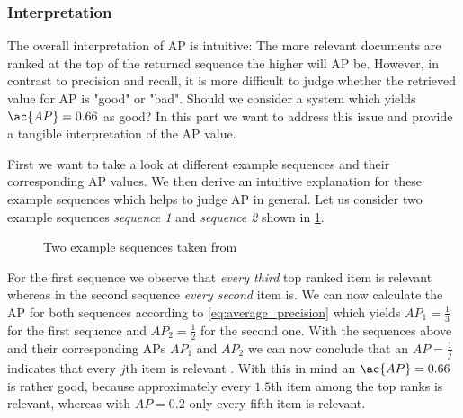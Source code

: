\subsubsection{Interpretation}
\label{chp:fundamentals:sec:metrics:subsec:average_precision:interpretation}
The overall interpretation of \ac{AP} is intuitive: The more relevant documents are ranked at the top of the returned sequence the higher will \ac{AP} be.
However, in contrast to precision and recall, it is more difficult to judge whether the retrieved value for \ac{AP} is "good" or "bad".
Should we consider a system which yields $\ac{AP}=0.66$ as good?
In this part we want to address this issue and provide a tangible interpretation of the \ac{AP} value.

First we want to take a look at different example sequences and their corresponding \ac{AP} values.
We then derive an intuitive explanation for these example sequences which helps to judge \ac{AP} in general.
Let us consider two example sequences \textit{sequence 1} and \textit{sequence 2} shown in \cref{fig:metrics:average_precision:interpreation:sample}.

\begin{figure}[htpb]
    \centering
    \def\svgwidth{\columnwidth}
    
    \caption[Two Example Sequences]{Two example sequences taken from \textcite{Tapaswi:2012}}\label{fig:metrics:average_precision:interpreation:sample}
\end{figure}

For the first sequence we observe that \textit{every third} top ranked item is relevant whereas in the second sequence \textit{every second} item is.
We can now calculate the \ac{AP} for both sequences according to \cref{eq:average_precision} which yields $AP_1= \frac{1}{3}$ for the first sequence and $AP_2= \frac{1}{2}$ for the second one.
With the sequences above and their corresponding \acp{AP} $AP_1$ and $AP_2$ we can now conclude that an $AP=\frac{1}{j}$ indicates that every $j$th item is relevant \parencite{Tapaswi:2012}.
With this in mind an $\ac{AP}=0.66$ is rather good, because approximately every $1.5$th item among the top ranks is relevant, whereas with $AP=0.2$ only every fifth item is relevant.
